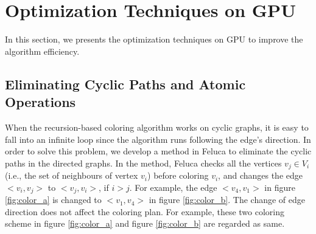 \section{Optimization Techniques on GPU}
\label{optimization}

In this section, we presents the optimization techniques on GPU to improve the algorithm efficiency.

\subsection{Eliminating Cyclic Paths and Atomic Operations}
\label{eliminate}
When the recursion-based coloring algorithm works on cyclic graphs, it is easy to fall into an infinite loop since 
the algorithm runs following the edge's direction. In order to solve this problem, we develop a method in Feluca to eliminate the cyclic paths in the directed graphs. In the method, Feluca checks all the vertices $v_j \in V_i$ (i.e., the set of neighbours of vertex $v_i$) before coloring $v_i$, and changes the edge $<v_i, v_j>$ to $<v_j, v_i>$, if $i>j$. For example, the edge $<v_4, v_1>$ in figure \ref{fig:color_a} is changed to $<v_1, v_4>$ in figure \ref{fig:color_b}. The change of edge direction does not affect the coloring plan. For example, these two coloring scheme in figure \ref{fig:color_a} and figure \ref{fig:color_b} are regarded as same.  

